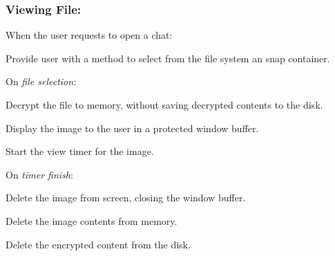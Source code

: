\documentclass[11pt, a4paper,titlepage]{report}
\begin{document}
\subsubsection{Viewing File:}
\begin{itemize*}
	\item When the user requests to open a chat:
	\begin{itemize*}
        	\item Provide user with a method to select from the file system an snap container.
		\item[] On \emph{file selection}:
		\begin{itemize*}
			\item Decrypt the file to memory, without saving decrypted contents to the disk.
			\item Display the image to the user in a protected window buffer.
			\item Start the view timer for the image.
		\end{itemize*}
		\item[] On \emph{timer finish}:
		\begin{itemize*}
			\item Delete the image from screen, closing the window buffer.
			\item Delete the image contents from memory.
			\item Delete the encrypted content from the disk.
		\end{itemize*}
	\end{itemize*}
\end{itemize*}
\end{document}
